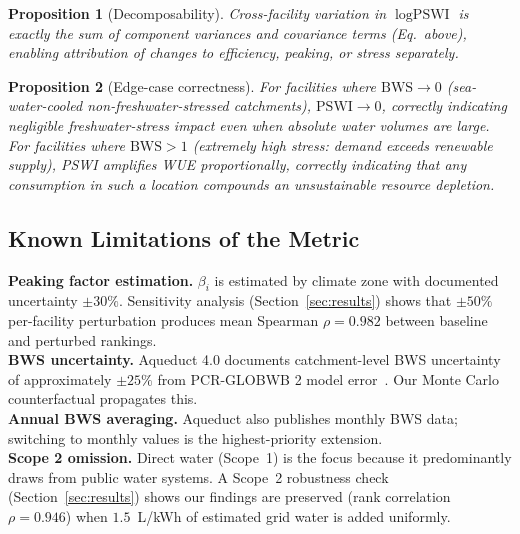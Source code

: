 \documentclass[conference,10pt]{IEEEtran}
\newtheorem{proposition}{Proposition}
\begin{document}
\begin{proposition}[Decomposability]
Cross-facility variation in $\log\textrm{PSWI}$ is exactly the sum of
component variances and covariance terms (Eq.\ above), enabling
attribution of changes to efficiency, peaking, or stress separately.
\end{proposition}

\begin{proposition}[Edge-case correctness]
For facilities where $\textrm{BWS} \to 0$ (sea-water-cooled
non-freshwater-stressed catchments), $\textrm{PSWI} \to 0$, correctly
indicating negligible freshwater-stress impact even when absolute water
volumes are large. For facilities where $\textrm{BWS} > 1$ (extremely
high stress: demand exceeds renewable supply), PSWI amplifies WUE
proportionally, correctly indicating that any consumption in such a
location compounds an unsustainable resource depletion.
\end{proposition}

\subsection{Known Limitations of the Metric}

\begin{tcolorbox}[colback=yellow!8, colframe=yellow!50!black,
                  title=Box 1: Quantified known limitations]
\textbf{Peaking factor estimation.} $\beta_i$ is estimated by climate
zone with documented uncertainty $\pm 30\%$. Sensitivity analysis
(Section~\ref{sec:results}) shows that $\pm 50\%$ per-facility
perturbation produces mean Spearman $\rho = 0.982$ between baseline
and perturbed rankings. \\[2pt]
\textbf{BWS uncertainty.} Aqueduct 4.0 documents catchment-level BWS
uncertainty of approximately $\pm 25\%$ from PCR-GLOBWB 2 model
error~\cite{kuzma2023aqueduct}. Our Monte Carlo counterfactual
propagates this. \\[2pt]
\textbf{Annual BWS averaging.} Aqueduct also publishes monthly BWS
data; switching to monthly values is the highest-priority
extension. \\[2pt]
\textbf{Scope 2 omission.} Direct water (Scope~1) is the focus
because it predominantly draws from public water systems. A Scope~2
robustness check (Section~\ref{sec:results}) shows our findings are
preserved (rank correlation $\rho = 0.946$) when $1.5$~L/kWh of
estimated grid water is added uniformly.
\end{tcolorbox}
\end{document}
